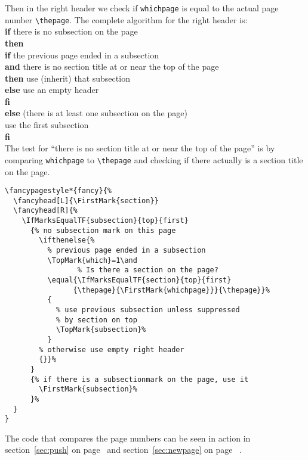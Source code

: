 \documentclass{article}
\begin{document}
\newpage
\noindent
\begin{boxedminipage}{\textwidth}
Then in the right header we check if \texttt{whichpage} is equal to the actual page number \verb|\thepage|. The complete algorithm for the right header is:\\[1ex]

\textbf{if} there is no subsection on the page\\
\textbf{then}\\
\hspace*{2em}\textbf{if} the previous page ended in a subsection\\
\hspace*{3em}\textbf{and} there is no section title at or near the top of the page\\
\hspace*{2em}\textbf{then} use (inherit) that subsection\\
\hspace*{2em}\textbf{else} use an empty header\\
\hspace*{2em}\textbf{fi}\\
\textbf{else} (there is at least one subsection on the page)\\
\hspace*{2em}use the first subsection\\
\textbf{fi}\\[1ex]

The test for ``there is no section title at or near the top of the page'' is by comparing \texttt{whichpage} to \verb|\thepage| and checking if there actually is a section title on the page.

\begin{verbatim}
\fancypagestyle*{fancy}{%
  \fancyhead[L]{\FirstMark{section}}
  \fancyhead[R]{%
    \IfMarksEqualTF{subsection}{top}{first}
      {% no subsection mark on this page
        \ifthenelse{%
          % previous page ended in a subsection
          \TopMark{which}=1\and
                 % Is there a section on the page?
          \equal{\IfMarksEqualTF{section}{top}{first}
                {\thepage}{\FirstMark{whichpage}}}{\thepage}}%
          {
            % use previous subsection unless suppressed
            % by section on top
            \TopMark{subsection}%
          }
        % otherwise use empty right header
        {}}%
      }
      {% if there is a subsectionmark on the page, use it
        \FirstMark{subsection}%
      }%
  }
}
\end{verbatim}

The code that compares the page numbers can be seen in action in section~\ref{sec:push} on page~\pageref{sec:push} and section~\ref{sec:newpage} on page~ \pageref{sec:newpage}.
\end{boxedminipage}
\end{document}
